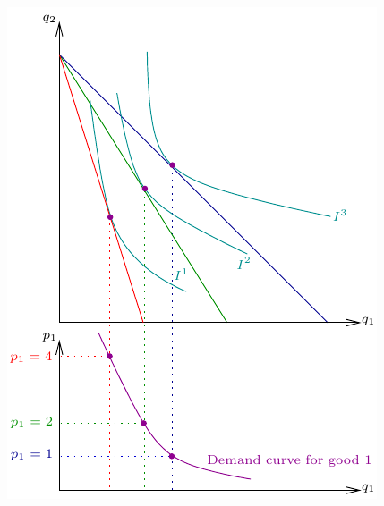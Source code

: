 \documentclass[xcolor=pdftex,dvipsnames]{beamer}
\begin{document}
\begin{frame}\begin{center}
\includegraphics[scale=0.9]{pics/DemandCurveDeriv2}
\end{center}\end{frame}
\end{document}
